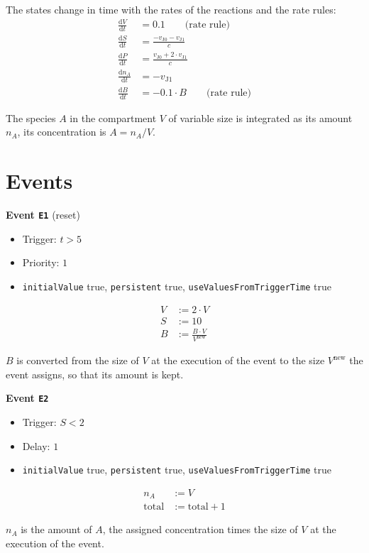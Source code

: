 \documentclass{article}
\begin{document}
The states change in time with the rates of the reactions and the rate rules:
\begin{align*}
  \frac{\mathrm{d} V}{\mathrm{d} t} &= 0.1 \qquad \text{(rate rule)} \\
  \frac{\mathrm{d} S}{\mathrm{d} t} &= \frac{-v_{\mathrm{J0}} - v_{\mathrm{J1}}}{c} \\
  \frac{\mathrm{d} P}{\mathrm{d} t} &= \frac{v_{\mathrm{J0}} + 2 \cdot v_{\mathrm{J1}}}{c} \\
  \frac{\mathrm{d} n_{A}}{\mathrm{d} t} &= -v_{\mathrm{J1}} \\
  \frac{\mathrm{d} B}{\mathrm{d} t} &= -0.1 \cdot B \qquad \text{(rate rule)}
\end{align*}

The species $A$ in the compartment $V$ of variable size is integrated as its amount $n_{A}$, its concentration is $A = n_{A} / V$.

\section{Events}

\textbf{Event \texttt{E1}} (reset)

\begin{itemize}
  \item Trigger: $t > 5$
  \item Priority: $1$
  \item \texttt{initialValue} true, \texttt{persistent} true, \texttt{useValuesFromTriggerTime} true
\end{itemize}
\begin{align*}
  V &\mathrel{:=} 2 \cdot V \\
  S &\mathrel{:=} 10 \\
  B &\mathrel{:=} \frac{B \cdot V}{V^{\mathrm{new}}}
\end{align*}

$B$ is converted from the size of $V$ at the execution of the event to the size $V^{\mathrm{new}}$ the event assigns, so that its amount is kept.

\textbf{Event \texttt{E2}}

\begin{itemize}
  \item Trigger: $S < 2$
  \item Delay: $1$
  \item \texttt{initialValue} true, \texttt{persistent} true, \texttt{useValuesFromTriggerTime} true
\end{itemize}
\begin{align*}
  n_{A} &\mathrel{:=} V \\
  \mathrm{total} &\mathrel{:=} \mathrm{total} + 1
\end{align*}

$n_{A}$ is the amount of $A$, the assigned concentration times the size of $V$ at the execution of the event.
\end{document}
